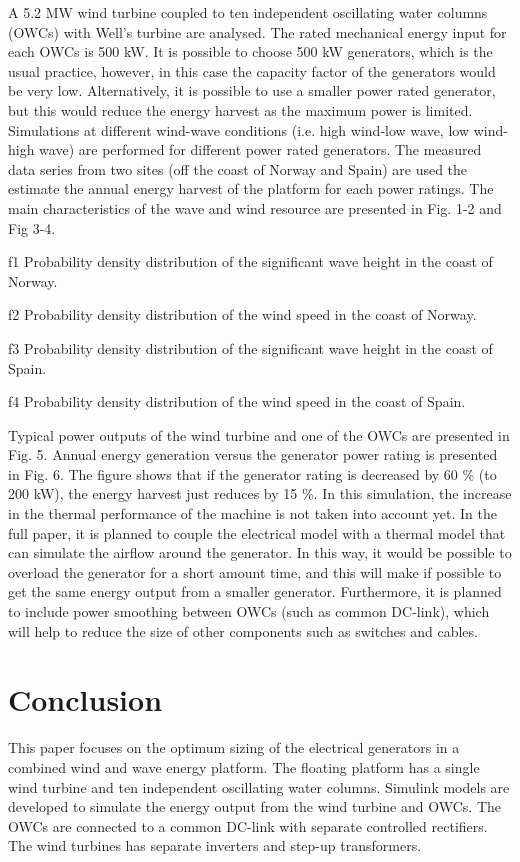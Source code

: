 \documentclass[twocolumn]{article}
\begin{document}
A 5.2 MW wind turbine coupled to ten independent oscillating water columns (OWCs) with Well's turbine are analysed. The rated mechanical energy input for each OWCs is 500 kW. It is possible to choose 500 kW generators, which is the usual practice, however, in this case the capacity factor of the generators would be very low. Alternatively, it is possible to use a smaller power rated generator, but this would reduce the energy harvest as the maximum power is limited. Simulations at different wind-wave conditions (i.e. high wind-low wave, low wind-high wave) are performed for different power rated generators. The measured data series from two sites (off the coast of Norway and Spain) are used the estimate the annual energy harvest of the platform for each power ratings. The main characteristics of the wave and wind resource are presented in Fig. 1-2 and Fig 3-4.

{f1} Probability density distribution of the significant wave height in the coast of Norway.

{f2} Probability density distribution of the wind speed in the coast of Norway.

{f3} Probability density distribution of the significant wave height in the coast of Spain.

{f4} Probability density distribution of the wind speed in the coast of Spain.

Typical power outputs of the wind turbine and one of the OWCs are presented in Fig. 5. Annual energy generation versus the generator power rating is presented in Fig. 6. The figure shows that if the generator rating is decreased by 60 \% (to 200 kW), the energy harvest just reduces by 15 \%.  In this simulation, the increase in the thermal performance of the machine is not taken into account yet. In the full paper, it is planned to couple the electrical model with a thermal model that can simulate the airflow around the generator. In this way, it would be possible to overload the generator  for a short amount time, and this will make if possible to get the same energy output from a smaller generator. Furthermore, it is planned to include power smoothing between OWCs (such as common DC-link), which will help to reduce the size of other components such as switches and cables.

\section{Conclusion}

This paper focuses on the optimum sizing of the electrical generators in a combined wind and wave energy platform. The floating platform has a single wind turbine and ten independent oscillating water columns. Simulink models are developed to simulate the energy output from the wind turbine and OWCs. The OWCs are connected to a common DC-link with separate controlled rectifiers. The wind turbines has separate inverters and step-up transformers.
\end{document}
